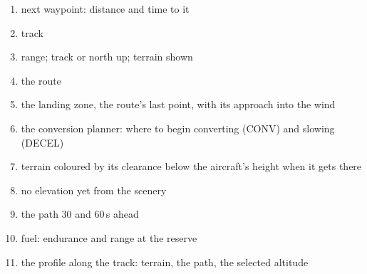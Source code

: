 \begin{enumerate}[label=\textbf{\arabic*},leftmargin=*,itemsep=0pt]
\item next waypoint: distance and time to it
\item track
\item range; track or north up; terrain shown
\item the route
\item the landing zone, the route's last point, with its approach into the wind
\item the conversion planner: where to begin converting (CONV) and slowing (DECEL)
\item terrain coloured by its clearance below the aircraft's height when it gets there
\item no elevation yet from the scenery
\item the path 30 and 60\,s ahead
\item fuel: endurance and range at the reserve
\item the profile along the track: terrain, the path, the selected altitude
\end{enumerate}

